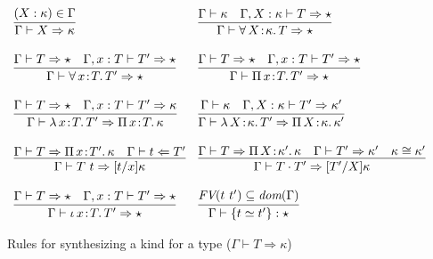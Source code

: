 \documentclass{article}
\newcommand{\abs}[4]{{#1}\, #2\! : \! #3.\, #4}
\newcommand{\tpcheck}[0]{\Leftarrow}
\newcommand{\tpsynth}[0]{\Rightarrow}
\begin{document}
\begin{figure}
  \[
  \begin{array}{ll}
    \infer{\Gamma \vdash X \tpsynth \kappa}{(X : \kappa) \in \Gamma} &
    \infer{\Gamma\vdash \abs{\forall}{X}{\kappa}{T} \tpsynth \star}{\Gamma \vdash \kappa & \Gamma,X:\kappa\vdash T \tpsynth \star} \\ \\
    \infer{\Gamma\vdash\abs{\forall}{x}{T}{T'} \tpsynth \star}{\Gamma \vdash T \tpsynth \star & \Gamma,x:T\vdash T' \tpsynth \star} &
    \infer{\Gamma\vdash\abs{\Pi}{x}{T}{T'} \tpsynth \star}{\Gamma \vdash T \tpsynth \star & \Gamma,x:T\vdash T' \tpsynth \star} \\ \\
    \infer{\Gamma\vdash\abs{\lambda}{x}{T}{T'} \tpsynth \abs{\Pi}{x}{T}{\kappa}}{\Gamma \vdash T \tpsynth \star & \Gamma,x:T\vdash T'\tpsynth\kappa} &
    \infer{\Gamma\vdash\abs{\lambda}{X}{\kappa}{T'} \tpsynth \abs{\Pi}{X}{\kappa}{\kappa'}}{\Gamma \vdash \kappa & \Gamma,X:\kappa\vdash T'\tpsynth\kappa'} \\ \\
    \infer{\Gamma\vdash T\ t \tpsynth [t/x]\kappa}{\Gamma\vdash T \tpsynth \abs{\Pi}{x}{T'}{\kappa} & \Gamma\vdash t \tpcheck T'} &
    \infer{\Gamma\vdash T\cdot T' \tpsynth [T'/X]\kappa}{\Gamma\vdash T \tpsynth \abs{\Pi}{X}{\kappa'}{\kappa} & \Gamma\vdash T' \tpsynth \kappa' & \kappa \cong \kappa'} \\ \\
    \infer{\Gamma\vdash\abs{\iota}{x}{T}{T'} \tpsynth \star}{\Gamma \vdash T \tpsynth \star & \Gamma,x:T\vdash T' \tpsynth \star} &
    \infer{\Gamma\vdash \{ t \simeq t' \} : \star}{\textit{FV}(t\ t')\subseteq\textit{dom}(\Gamma)}
  \end{array}
  \]
  \caption{Rules for synthesizing a kind for a type ($\Gamma \vdash T \tpsynth \kappa$)}
  \label{fig:knd}
\end{figure}
\end{document}
